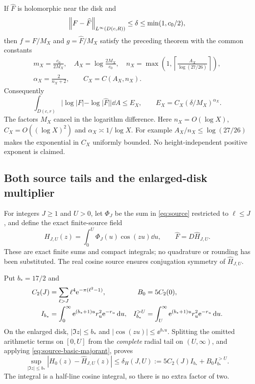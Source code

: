 If $\widehat F$ is holomorphic near the disk and
\begin{equation}\label{eq:delta-requirement}
 \left\|F-\widehat F\right\|_{L^\infty(D(c,R))}\le\delta
 \le\min(1,c_0/2),
\end{equation}
then $f=F/M_X$ and $g=\widehat F/M_X$ satisfy the preceding theorem
with the common constants
\begin{equation}\label{eq:canonical-constants}
 \begin{gathered}
 m_X=\frac{c_0}{2M_X},\quad A_X=\log\frac{2M_X}{c_0},\quad
 n_X=\max\!\left(1,\left\lceil\frac{A_X}{\log(27/26)}\right\rceil\right),\\
 \alpha_X=\frac2{n_X+2},\qquad C_X=C(A_X,n_X).
 \end{gathered}
\end{equation}
Consequently
\begin{equation}\label{eq:EX}
 \int_{D(c,r)}|\log|F|-\log|\widehat F||\dd A
 \le E_X,\qquad E_X=C_X(\delta/M_X)^{\alpha_X}.
\end{equation}
The factors $M_X$ cancel in the logarithm difference.
Here $n_X=O(\log X)$, $C_X=O((\log X)^2)$ and
$\alpha_X\asymp1/\log X$. For example
$A_X/n_X\le\log(27/26)$ makes the exponential in $C_X$
uniformly bounded. No height-independent positive exponent is claimed.

\subsection{Both source tails and the enlarged-disk multiplier}

For integers $J\ge1$ and $U>0$, let $\Phi_J$ be the sum in
\eqref{eq:source} restricted to $\ell\le J$, and define the exact
finite-source field
\begin{equation}\label{eq:finite-source}
 \widehat H_{J,U}(z)=\int_0^U\Phi_J(u)\cos(zu)\dd u,\qquad
 \widehat F=D\widehat H_{J,U}.
\end{equation}
These are exact finite sums and compact integrals; no quadrature or
rounding has been substituted. The real cosine source ensures
conjugation symmetry of $\widehat H_{J,U}$.

Put $b_* =17/2$ and
\begin{align}
 C_2(J)&=\sum_{\ell>J}\ell^4\mathrm e^{-\pi(\ell^2-1)},
 & B_0&=5C_2(0),\label{eq:source-tail-defs}\\
 I_{b_*}&=\int_0^\infty
       \mathrm e^{(b_*+1)u}r_u^2\mathrm e^{-r_u}\,\mathrm d u,
 &I_{b_*}^{>U}&=\int_U^\infty
       \mathrm e^{(b_*+1)u}r_u^2\mathrm e^{-r_u}\,\mathrm d u .\notag
\end{align}
On the enlarged disk, $|\Im z|\le b_*$ and
$|\cos(zu)|\le\ee^{b_*u}$.
Splitting the omitted arithmetic terms on $[0,U]$ from the
\emph{complete} radial tail on $(U,\infty)$, and applying
\eqref{eq:source-basic-majorant}, proves
\begin{equation}\label{eq:delta-H}
 \sup_{|\Im z|\le b_*}|H_0(z)-\widehat H_{J,U}(z)|
 \le\delta_H(J,U):=5C_2(J)I_{b_*}+B_0I_{b_*}^{>U}.
\end{equation}
The integral is a half-line cosine integral, so there is no extra
factor of two.

